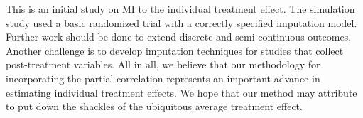 	This is an initial study on MI to the individual treatment effect. The simulation study used a basic randomized trial with a correctly specified imputation model. Further work should be done to extend discrete and semi-continuous outcomes. Another challenge is to develop imputation techniques for studies that collect post-treatment variables. All in all, we believe that our methodology for incorporating the partial correlation represents an important advance in estimating individual treatment effects. We hope that our method may attribute to put down the shackles of the ubiquitous average treatment effect.  
